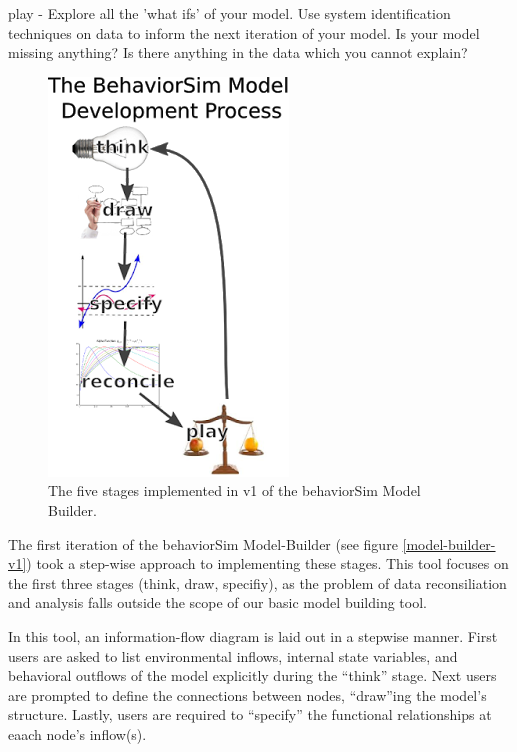 \documentclass[conference]{IEEEtran}
\begin{document}
play - 
Explore all the 'what ifs' of your model. 
Use system identification techniques on data to inform the next iteration of your model. 
Is your model missing anything? 
Is there anything in the data which you cannot explain? 

\begin{figure}[!t]
  \centering
  \includegraphics[width=0.5\columnwidth]{img/behaviorSim_process}  
  \caption{The five stages implemented in v1 of the behaviorSim Model Builder.}
  \label{model-builder-stages}
\end{figure}
  
The first iteration of the behaviorSim Model-Builder (see figure \ref{model-builder-v1}) took a step-wise approach to implementing these stages.
This tool focuses on the first three stages (think, draw, specifiy), as the problem of data reconsiliation and analysis falls outside the scope of our basic model building tool.

In this tool, an information-flow diagram is laid out in a stepwise manner.
First users are asked to list environmental inflows, internal state variables, and behavioral outflows of the model explicitly during the ``think'' stage.
Next users are prompted to define the connections between nodes, ``draw''ing the model's structure.
Lastly, users are required to ``specify'' the functional relationships at eaach node's inflow(s).

\end{document}
